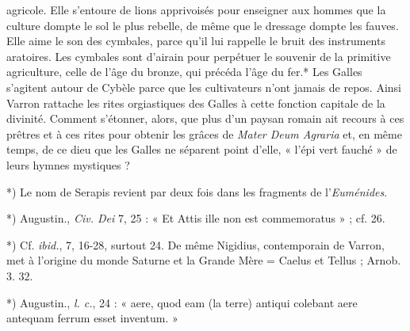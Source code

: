 \documentclass[a4paper, 11pt, oneside, polutonikogreek, french]{article}
\begin{document}
agricole. Elle s'entoure de lions apprivoisés pour enseigner aux hommes que la culture dompte le sol le plus rebelle, de même que le dressage dompte les fauves. Elle aime le son des cymbales, parce qu'il lui rappelle le bruit des instruments aratoires. Les cymbales sont d'airain pour perpétuer le souvenir de la primitive agriculture, celle de l'âge du bronze, qui précéda l'âge du fer.* Les Galles s'agitent autour de Cybèle parce que les cultivateurs n'ont jamais de repos. Ainsi Varron rattache les rites orgiastiques des Galles à cette fonction capitale de la divinité. Comment s'étonner, alors, que plus d'un paysan romain ait recours à ces prêtres et à ces rites pour obtenir les grâces de \emph{Mater Deum Agraria} et, en même temps, de ce dieu que les Galles ne séparent point d'elle, « l'épi vert fauché » de leurs hymnes mystiques ?

*) Le nom de Serapis revient par deux fois dans les fragments de l'\emph{Euménides}.

*) Augustin., \emph{Civ. Dei} 7, 25 : « Et Attis ille non est commemoratus » ; cf. 26.

*) Cf. \emph{ibid.}, 7, 16-28, surtout 24. De même Nigidius, contemporain de Varron, met à l'origine du monde Saturne et la Grande Mère = Caelus et Tellus ; Arnob. 3. 32.

*) Augustin., \emph{l. c.}, 24 : « aere, quod eam (la terre) antiqui colebant aere antequam ferrum esset inventum. »
\end{document}
